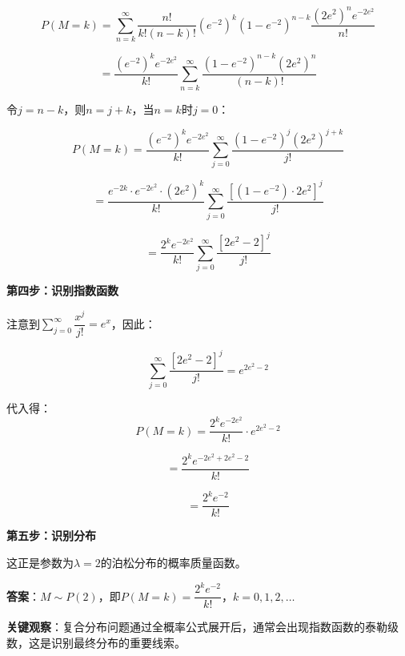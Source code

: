 \documentclass[standard]{ExBook}
\begin{document}
\begin{qitems}
\begin{bbox}
\begin{solution}
            $$P(M=k) = \sum_{n=k}^{\infty} \frac{n!}{k!(n-k)!} (e^{-2})^k (1-e^{-2})^{n-k} \frac{(2e^2)^n e^{-2e^2}}{n!}$$
            
            $$= \frac{(e^{-2})^k e^{-2e^2}}{k!} \sum_{n=k}^{\infty} \frac{(1-e^{-2})^{n-k}(2e^2)^n}{(n-k)!}$$
            
            令$j = n-k$，则$n = j+k$，当$n=k$时$j=0$：
            
            $$P(M=k) = \frac{(e^{-2})^k e^{-2e^2}}{k!} \sum_{j=0}^{\infty} \frac{(1-e^{-2})^j (2e^2)^{j+k}}{j!}$$
            
            $$= \frac{e^{-2k} \cdot e^{-2e^2} \cdot (2e^2)^k}{k!} \sum_{j=0}^{\infty} \frac{[(1-e^{-2}) \cdot 2e^2]^j}{j!}$$
            
            $$= \frac{2^k e^{-2e^2}}{k!} \sum_{j=0}^{\infty} \frac{[2e^2 - 2]^j}{j!}$$
            
            \textbf{第四步：识别指数函数}
            
            注意到$\sum\limits_{j=0}^{\infty} \dfrac{x^j}{j!} = e^x$，因此：
            
            $$\sum_{j=0}^{\infty} \frac{[2e^2 - 2]^j}{j!} = e^{2e^2 - 2}$$
            
            代入得：
            $$P(M=k) = \frac{2^k e^{-2e^2}}{k!} \cdot e^{2e^2 - 2}$$
            
            $$= \frac{2^k e^{-2e^2 + 2e^2 - 2}}{k!}$$
            
            $$= \frac{2^k e^{-2}}{k!}$$
            
            \textbf{第五步：识别分布}
            
            这正是参数为$\lambda = 2$的泊松分布的概率质量函数。
            
            \textbf{答案}：$\boxed{M \sim P(2)}$，即$P(M=k) = \dfrac{2^k e^{-2}}{k!}$，$k=0,1,2,\dots$
            
            \textbf{关键观察}：复合分布问题通过全概率公式展开后，通常会出现指数函数的泰勒级数，这是识别最终分布的重要线索。
        \end{solution}
    \end{bbox}

\end{qitems}
\end{document}
